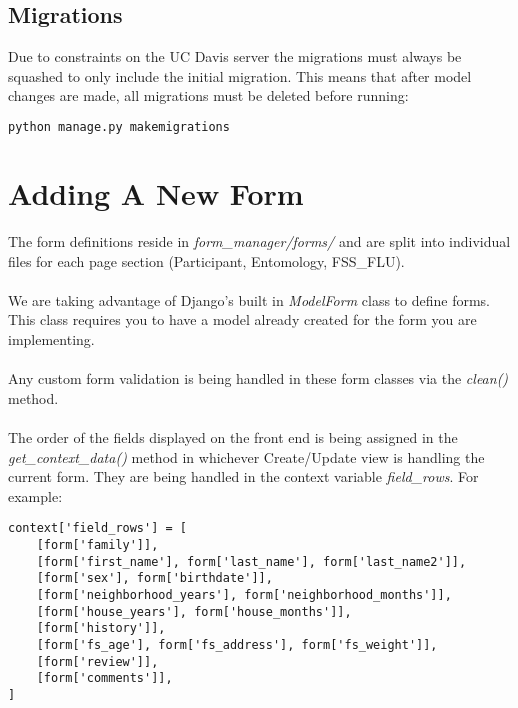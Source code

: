 \documentclass{article}
\begin{document}
\subsection{Migrations}
Due to constraints on the UC Davis server the migrations must always be squashed to only include the initial migration.  This means that after model changes are made, all migrations must be deleted before running:
\begin{lstlisting}[language=bash]
  python manage.py makemigrations
\end{lstlisting}

\section{Adding A New Form}
The form definitions reside in \textit{form\_manager/forms/} and are split into individual files for each page section (Participant, Entomology, FSS\_FLU). 
\\\\We are taking advantage of Django's built in \textit{ModelForm} class to define forms. This class requires you to have a model already created for the form you are implementing.
\\\\Any custom form validation is being handled in these form classes via the \textit{clean()} method.
\\\\The order of the fields displayed on the front end is being assigned in the \textit{get\_context\_data()} method in whichever Create/Update view is handling the current form.  They are being handled in the context variable \textit{field\_rows}.  For example:
\begin{verbatim}
context['field_rows'] = [
    [form['family']],
    [form['first_name'], form['last_name'], form['last_name2']],
    [form['sex'], form['birthdate']],
    [form['neighborhood_years'], form['neighborhood_months']],
    [form['house_years'], form['house_months']],
    [form['history']],
    [form['fs_age'], form['fs_address'], form['fs_weight']],
    [form['review']],
    [form['comments']],
]
\end{verbatim}
\end{document}
